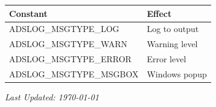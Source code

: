 \documentclass[11pt,a4paper]{article}
\begin{document}
\begin{table}[h]
\centering
\begin{tabular}{@{}ll@{}}
\toprule
\textbf{Constant} & \textbf{Effect} \\
\midrule
ADSLOG\_MSGTYPE\_LOG & Log to output \\
ADSLOG\_MSGTYPE\_WARN & Warning level \\
ADSLOG\_MSGTYPE\_ERROR & Error level \\
ADSLOG\_MSGTYPE\_MSGBOX & Windows popup \\
\bottomrule
\end{tabular}
\end{table}

\vfill

\begin{center}
\textit{Last Updated: \today}
\end{center}
\end{document}
